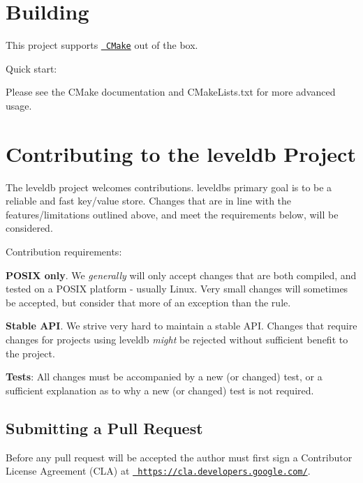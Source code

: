 \section*{Building}

This project supports \href{https://cmake.org/}{\texttt{ C\+Make}} out of the box.

Quick start\+:


\begin{DoxyCode}{0}
\end{DoxyCode}


Please see the C\+Make documentation and {\ttfamily C\+Make\+Lists.\+txt} for more advanced usage.

\section*{Contributing to the leveldb Project}

The leveldb project welcomes contributions. leveldb\textquotesingle{}s primary goal is to be a reliable and fast key/value store. Changes that are in line with the features/limitations outlined above, and meet the requirements below, will be considered.

Contribution requirements\+:


\begin{DoxyEnumerate}
\item {\bfseries{P\+O\+S\+IX only}}. We {\itshape generally} will only accept changes that are both compiled, and tested on a P\+O\+S\+IX platform -\/ usually Linux. Very small changes will sometimes be accepted, but consider that more of an exception than the rule.
\item {\bfseries{Stable A\+PI}}. We strive very hard to maintain a stable A\+PI. Changes that require changes for projects using leveldb {\itshape might} be rejected without sufficient benefit to the project.
\item {\bfseries{Tests}}\+: All changes must be accompanied by a new (or changed) test, or a sufficient explanation as to why a new (or changed) test is not required.
\end{DoxyEnumerate}

\subsection*{Submitting a Pull Request}

Before any pull request will be accepted the author must first sign a Contributor License Agreement (C\+LA) at \href{https://cla.developers.google.com/}{\texttt{ https\+://cla.\+developers.\+google.\+com/}}.

